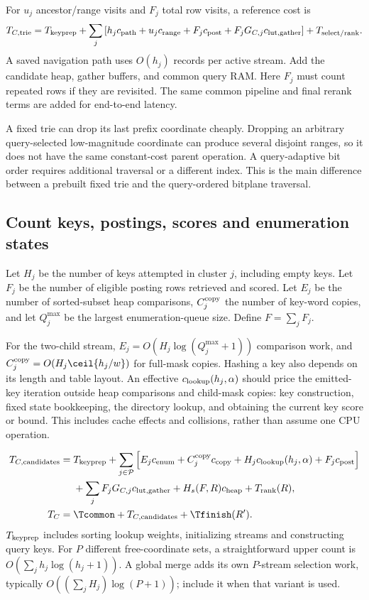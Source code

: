 For $u_j$ ancestor/range visits and $F_j$ total row visits, a reference cost is
\begin{equation}
T_{C,\rm trie}=T_{\rm keyprep}+
\sum_j\left[h_jc_{\rm path}+u_jc_{\rm range}+F_jc_{\rm post}
 +F_jG_{C,j}c_{\rm lut,gather}\right]+T_{\rm select/rank}.
\label{eq:trie-cost}
\end{equation}
A saved navigation path uses $O(h_j)$ records per active stream. Add the candidate heap,
gather buffers, and common query RAM. Here $F_j$ must count repeated rows if they are revisited.
The same common pipeline and final rerank terms are added for end-to-end latency.

A fixed trie can drop its last prefix coordinate cheaply. Dropping an arbitrary
query-selected low-magnitude coordinate can produce several disjoint ranges, so it does not
have the same constant-cost parent operation. A query-adaptive bit order requires additional
traversal or a different index. This is the main difference between a prebuilt fixed trie and
the query-ordered bitplane traversal.

\subsection{Count keys, postings, scores and enumeration states}
Let $H_j$ be the number of keys attempted in cluster $j$, including empty keys. Let $F_j$ be
the number of eligible posting rows retrieved and scored. Let $E_j$ be the number of
sorted-subset heap comparisons, $C_j^{\rm copy}$ the number of key-word copies, and let
$Q_j^{\max}$ be the largest enumeration-queue size. Define $F=\sum_jF_j$.

For the two-child stream, $E_j=O(H_j\log(Q_j^{\max}+1))$ comparison work, and
$C_j^{\rm copy}=O(H_j\ceil{h_j/w})$ for full-mask copies. Hashing a key also depends on its
length and table layout. An effective $c_{\rm lookup}(h_j,\alpha)$ should price the emitted-key iteration outside heap comparisons and child-mask copies: key construction, fixed state bookkeeping, the directory lookup, and obtaining the current key score or bound. This includes cache effects and collisions, rather than assume one CPU operation.

\begin{align}
T_{C,\rm candidates}={}&T_{\rm keyprep}
 +\sum_{j\in\mathcal P}\Big[
 E_jc_{\rm enum}+C_j^{\rm copy}c_{\rm copy}
 +H_jc_{\rm lookup}(h_j,\alpha)+F_jc_{\rm post}\Big]\notag\\
 &+\sum_j F_jG_{C,j}c_{\rm lut,gather}+H_s(F,R)c_{\rm heap}+T_{\rm rank}(R),
\label{eq:keys-time}\\
T_C={}&\Tcommon+T_{C,\rm candidates}+\Tfinish(R').
\label{eq:keys-total}
\end{align}
$T_{\rm keyprep}$ includes sorting lookup weights, initializing streams and constructing
query keys. For $P$ different free-coordinate sets, a straightforward upper count is
$O(\sum_jh_j\log(h_j+1))$. A global merge adds its own $P$-stream selection work, typically
$O((\sum_jH_j)\log(P+1))$; include it when that variant is used.

